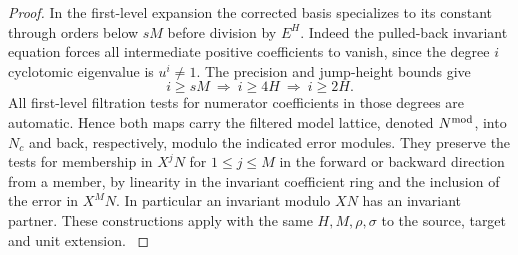 \begin{proof}
In the first-level expansion the corrected basis specializes to its
constant through orders below \(sM\) before division by \(E^H\).
Indeed the pulled-back invariant equation forces all intermediate
positive coefficients to vanish, since the degree \(i\) cyclotomic
eigenvalue is \(u^i\ne1\). The precision and jump-height bounds give
\[
 i\ge sM\ \Longrightarrow\ i\ge4H\ \Longrightarrow\ i\ge2H.
\]
All first-level filtration tests for numerator coefficients in those degrees are automatic. Hence both maps carry the filtered model lattice,
denoted \(N^{\rm mod}\), into \(N_c\) and back, respectively, modulo
the indicated error modules. They preserve the tests for membership
in \(X^jN\) for \(1\le j\le M\) in the forward or backward direction
from a member, by linearity in the invariant coefficient ring and
the inclusion of the error in \(X^MN\). In particular an invariant
modulo \(XN\) has an invariant partner. These constructions apply
with the same \(H,M,\rho,\sigma\) to the source, target and unit
extension.
\label{cor:row-metric-3}
\end{proof}
